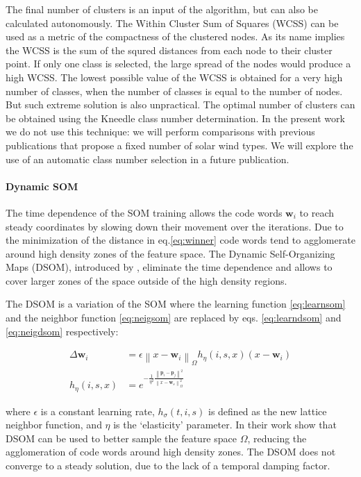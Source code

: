 The final number of clusters is an input of the algorithm, but can also be calculated autonomously. The Within Cluster Sum of Squares (WCSS) can be used as a metric of the compactness of the clustered nodes. As its name implies the WCSS is the sum of the squred distances from each node to their cluster point. If only one class is selected, the large spread of the nodes would produce a high WCSS. The lowest possible value of the WCSS is obtained for a very high number of classes, when the number of classes is equal to the number of nodes. But such extreme solution is also unpractical. The optimal number of clusters can be obtained using the Kneedle class number determination\citep{5961514}. In the present work we do not use this technique: we will perform comparisons with previous publications that propose a fixed number of solar wind types. We will explore the use of an automatic class number selection in a future publication.

\paragraph{Dynamic SOM}
The time dependence of the SOM training allows the code words $\boldsymbol{w}_i$ to reach steady coordinates by slowing down their movement over the iterations. Due to the minimization of the distance in eq.\eqref{eq:winner} code words tend to agglomerate around high density zones of the feature space. The Dynamic Self-Organizing Maps (DSOM), introduced by \citep{Rougier2011}, eliminate the time dependence and allows to cover larger zones of the space outside of the high density regions.

The DSOM is a variation of the SOM where the learning function \eqref{eq:learnsom} and the neighbor function \eqref{eq:neigsom} are replaced by eqs. \eqref{eq:learndsom} and \eqref{eq:neigdsom} respectively:

\begin{align}
\Delta \boldsymbol{w}_i & = \epsilon \left\lVert x - \boldsymbol{w}_i \right\rVert_\Omega h_\eta(i,s,x)(x-\boldsymbol{w}_i) \label{eq:learndsom} \\
h_\eta(i,s,x) & = e^{-\frac{1}{\eta^2}\frac{\left\lVert \boldsymbol{p}_i - \boldsymbol{p}_j \right\rVert^2}{\left\lVert x - \boldsymbol{w}_s \right\rVert_\Omega^2}} \label{eq:neigdsom} 
\end{align}

where $\epsilon$ is a constant learning rate, $h_\sigma(t,i,s)$ is defined as the new lattice neighbor function, and $\eta$ is the `elasticity' parameter. In their work \citep{Rougier2011} show that DSOM can be used to better sample the feature space $\Omega$, reducing the agglomeration of code words around high density zones. The DSOM does not converge to a steady solution, due to the lack of a temporal damping factor.

